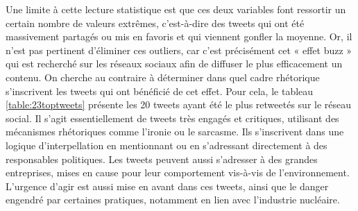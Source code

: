             Une limite à cette lecture statistique est que ces deux variables font ressortir un certain nombre de valeurs extrêmes, c’est-à-dire des tweets qui ont été massivement partagés ou mis en favoris et qui viennent gonfler la moyenne. Or, il n’est pas pertinent d’éliminer ces outliers, car c’est précisément cet « effet buzz » qui est recherché sur les réseaux sociaux afin de diffuser le plus efficacement un contenu. On cherche au contraire à déterminer dans quel cadre rhétorique s’inscrivent les tweets qui ont bénéficié de cet effet. Pour cela, le tableau \ref{table:23toptweets} présente les 20 tweets ayant été le plus retweetés sur le réseau social. Il s’agit essentiellement de tweets très engagés et critiques, utilisant des mécanismes rhétoriques comme l’ironie ou le sarcasme. Ils s’inscrivent dans une logique d’interpellation en mentionnant ou en s’adressant directement à des responsables politiques. Les tweets peuvent aussi s’adresser à des grandes entreprises, mises en cause pour leur comportement vis-à-vis de l’environnement. L’urgence d’agir est aussi mise en avant dans ces tweets, ainsi que le danger engendré par certaines pratiques, notamment en lien avec l’industrie nucléaire. \\


